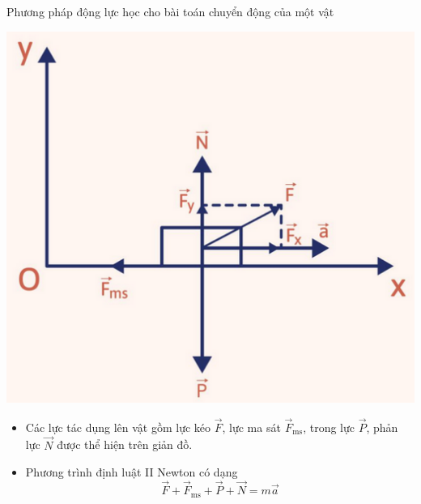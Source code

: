 \begin{dang}{Phương pháp động lực học cho bài toán chuyển động của một vật}
{\begin{center}
		\includegraphics[scale=0.5]{../figs/G10-17-1}
	\end{center}
	
	\begin{itemize}
		\item Các lực tác dụng lên vật gồm lực kéo $\vec F$, lực ma sát $\vec F_\text{ms}$, trong lực $\vec P$, phản lực $\vec N$ được thể hiện trên giản đồ. 
		
		\item Phương trình định luật II Newton có dạng 
		\begin{equation}\label{*}
			\vec F +\vec F_\text{ms} + \vec P + \vec N = m \vec a
		\end{equation}
		

\end{itemize}}
\end{dang}
